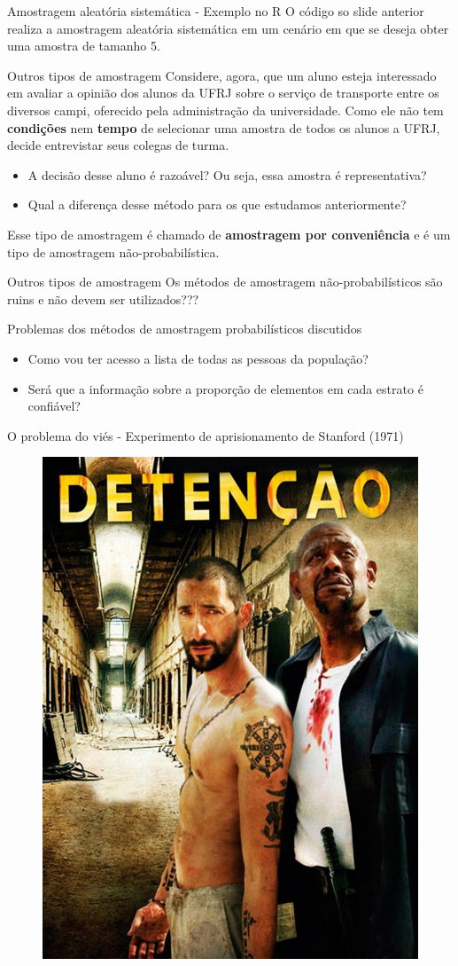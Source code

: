 \begin{frame}{Amostragem aleatória sistemática - Exemplo no R}
    O código so slide anterior realiza a amostragem aleatória sistemática em um cenário
    em que se deseja obter uma amostra de tamanho 5.
\end{frame}

\begin{frame}{Outros tipos de amostragem}
 Considere, agora, que um aluno esteja interessado em avaliar a opinião dos alunos da UFRJ
sobre o serviço de transporte entre os diversos campi, oferecido pela administração da universidade.  
Como ele não tem \textbf{condições} nem \textbf{tempo} de selecionar uma amostra de todos
os alunos a UFRJ, decide entrevistar seus colegas de turma.
\pause
\begin{itemize}
    \item A decisão desse aluno é razoável? Ou seja, essa amostra é representativa?
    \item Qual a diferença desse método para os que estudamos anteriormente?
\end{itemize}
\pause
Esse tipo de amostragem é chamado de \textbf{amostragem por conveniência} e é um tipo de amostragem não-probabilística. 
\end{frame}

\begin{frame}{Outros tipos de amostragem}
    Os métodos de amostragem não-probabilísticos são ruins e não devem ser utilizados???
\end{frame}

\begin{frame}{Problemas dos métodos de amostragem probabilísticos discutidos}
    \begin{itemize}
        \item Como vou ter acesso a lista de todas as pessoas da população?
        \pause
        \item Será que a informação sobre a proporção de elementos em cada estrato é confiável?
    \end{itemize}
\end{frame}

\begin{frame}{O problema do viés - Experimento de aprisionamento de Stanford (1971)}
    \begin{figure}
        \centering
        \includegraphics[width=0.4\linewidth]{figures/filme_1.jpg}
    \end{figure}
\end{frame}

